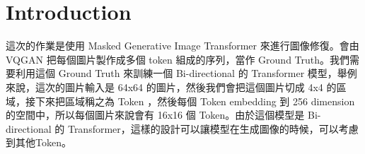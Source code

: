 \section{Introduction}

這次的作業是使用 Masked Generative Image Transformer 來進行圖像修復。會由 VQGAN 把每個圖片製作成多個 token 組成的序列，當作 Ground Truth。我們需要利用這個 Ground Truth 來訓練一個 Bi-directional 的 Transformer 模型，舉例來說，這次的圖片輸入是 64x64 的圖片，然後我們會把這個圖片切成 4x4 的區域，接下來把區域稱之為 Token ，然後每個 Token embedding 到 256 dimension 的空間中，所以每個圖片來說會有 16x16 個 Token。由於這個模型是 Bi-directional 的 Transformer，這樣的設計可以讓模型在生成圖像的時候，可以考慮到其他Token。